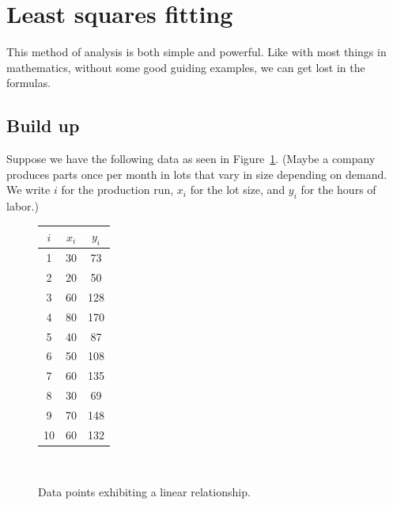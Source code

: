 \documentclass[a4paper, 12pt]{article}
\numberwithin{equation}{section}
\numberwithin{figure}{section}
\theoremstyle{definition}
\begin{document}
\section{Least squares fitting}

This method of analysis is both simple and powerful. Like with most things in
mathematics, without some good guiding examples, we can get lost in the
formulas.

\subsection{Build up}\label{sec:build-up}

Suppose we have the following data as seen in Figure~\ref{fig:2d-linear-data}. (Maybe
a company produces parts once per month in lots that vary in size depending on
demand. We write $i$ for the production run, $x_i$ for the lot size, and $y_i$
for the hours of labor.) 

\begin{figure}[h]
	\centering
	\begin{minipage}{0.33\textwidth}
		\centering
		\begin{tabular}{ccc}
			$i$ & $x_i$ & $y_i$ \\ \hline 
			1 & 30 & 73 \\ 
			2 & 20 & 50 \\
			3 & 60 & 128 \\
			4 & 80 & 170 \\
			5 & 40 & 87 \\
			6 & 50 & 108 \\
			7 & 60 & 135 \\
			8 & 30 & 69 \\
			9 & 70 & 148 \\
			10 & 60 & 132 
		\end{tabular}
	\end{minipage}~%
	\begin{minipage}{0.60\textwidth}
		\centering
	\end{minipage}
	\caption{Data points exhibiting a linear relationship.}
	\label{fig:2d-linear-data}
\end{figure}
\end{document}
